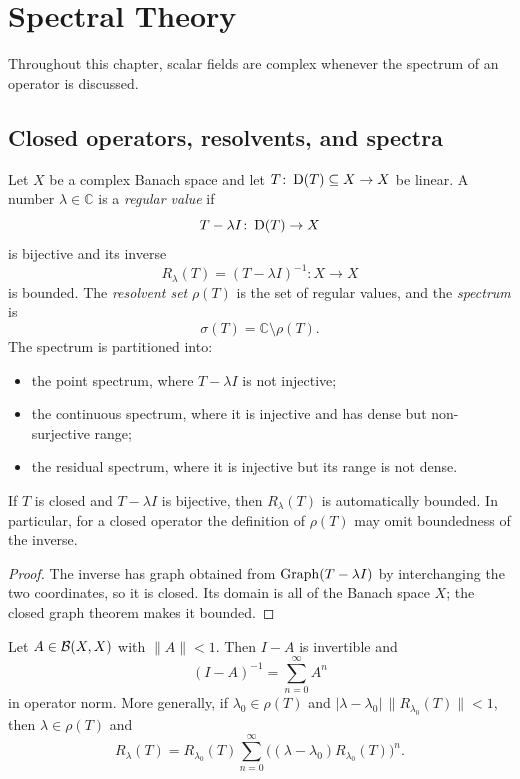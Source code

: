 \chapter{Spectral Theory}

Throughout this chapter, scalar fields are complex whenever the spectrum of an
operator is discussed.

\section{Closed operators, resolvents, and spectra}

\begin{notedefinition}
Let $X$ be a complex Banach space and let
$T\colon\operatorname{D}(T)\subseteq X\to X$ be linear.  A number $\lambda\in\mathbb C$
is a \emph{regular value} if
\[
  T-\lambda I\colon\operatorname{D}(T)\to X
\]
is bijective and its inverse
\[
  R_\lambda(T)=(T-\lambda I)^{-1}\colon X\to X
\]
is bounded.  The \emph{resolvent set} $\rho(T)$ is the set of regular values,
and the \emph{spectrum} is
\[
  \sigma(T)=\mathbb C\setminus\rho(T).
\]
The spectrum is partitioned into:
\begin{itemize}
  \item the point spectrum, where $T-\lambda I$ is not injective;
  \item the continuous spectrum, where it is injective and has dense but
        non-surjective range;
  \item the residual spectrum, where it is injective but its range is not
        dense.
\end{itemize}
\end{notedefinition}

\begin{noteproposition}
If $T$ is closed and $T-\lambda I$ is bijective, then
$R_\lambda(T)$ is automatically bounded.  In particular, for a closed
operator the definition of $\rho(T)$ may omit boundedness of the inverse.
\end{noteproposition}

\begin{proof}
The inverse has graph obtained from $\operatorname{Graph}(T-\lambda I)$ by interchanging the
two coordinates, so it is closed.  Its domain is all of the Banach space $X$;
the closed graph theorem makes it bounded.
\end{proof}

\begin{notetheorem}
Let $A\in\mathcal{B}(X,X)$ with $\|A\|<1$.  Then $I-A$ is invertible and
\[
  (I-A)^{-1}=\sum_{n=0}^{\infty}A^n
\]
in operator norm.  More generally, if $\lambda_0\in\rho(T)$ and
$|\lambda-\lambda_0|\,\|R_{\lambda_0}(T)\|<1$, then $\lambda\in\rho(T)$ and
\[
  R_\lambda(T)
  =R_{\lambda_0}(T)
   \sum_{n=0}^{\infty}
     \bigl((\lambda-\lambda_0)R_{\lambda_0}(T)\bigr)^n.
\]
\end{notetheorem}

